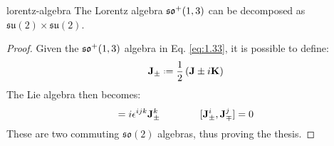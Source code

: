 \begin{proposition}{}{lorentz-algebra}
  The Lorentz algebra $ \mathfrak{so}^+(1,3) $ can be decomposed as $ \mathfrak{su}(2) \times \mathfrak{su}(2) $.

  \tcblower

  \begin{proof}
    Given the $ \mathfrak{so}^+(1,3) $ algebra in Eq. \ref{eq:1.33}, it is possible to define:
    \begin{equation*}
      \ve{J}_{\pm} \defeq \frac{1}{2} \left( \ve{J} \pm i \ve{K} \right)
    \end{equation*}
    The Lie algebra then becomes:
    \begin{equation*}
      [\ve{J}_{\pm}^i, \ve{J}_{\pm}^j] = i \epsilon^{ijk} \ve{J}_{\pm}^k
      \qquad \qquad
      [\ve{J}_{\pm}^i, \ve{J}_{\mp}^j] = 0
    \end{equation*}
    These are two commuting $ \mathfrak{so}(2) $ algebras, thus proving the thesis.
  \end{proof}
\end{proposition}

